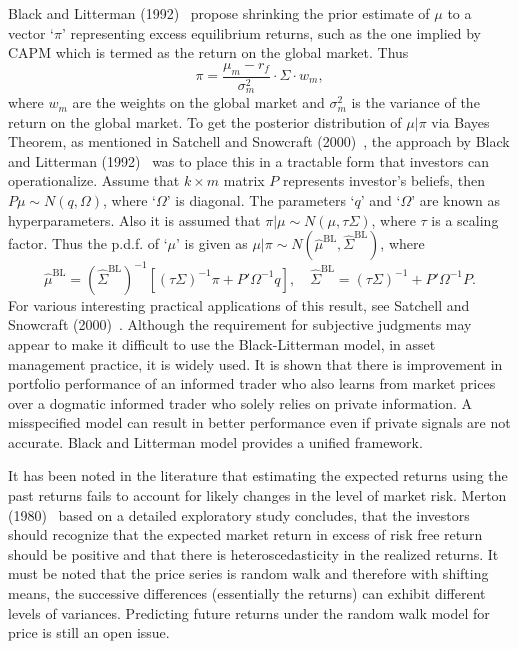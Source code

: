 Black and Litterman (1992)~\cite{blacklit} propose shrinking the prior estimate of $\mu$ to a vector `$\pi$' representing excess equilibrium returns, such as the one implied by CAPM which is termed as the return on the global market. Thus
	\begin{equation} \label{eqn:bigpi}
	\pi = \dfrac{\mu_m-r_f}{\sigma_m^2} \cdot \Sigma \cdot w_m,
	\end{equation}
where $w_m$ are the weights on the global market and $\sigma_m^2$ is the variance of the return on the global market. To get the posterior distribution of $\mu \big| \pi$ via Bayes Theorem, as mentioned in Satchell and Snowcraft (2000)~\cite{snow}, the approach by Black and Litterman (1992)~\cite{blacklit}  was to place this in a tractable form that investors can operationalize. Assume that $k \times m$ matrix $P$ represents investor's beliefs, then $P \mu \sim N(q,\Omega)$, where `$\Omega$' is diagonal. The parameters `$q$' and `$\Omega$' are known as hyperparameters. Also it is assumed that $\pi \big| \mu \sim N(\mu,\tau \Sigma)$, where $\tau$ is a scaling factor. Thus the p.d.f. of `$\mu$' is given as $\mu \big| \pi \sim N(\hat{\mu}^{\text{BL}}, \hat{\Sigma}^{\text{BL}})$, where 
	\begin{equation} \label{eqn:bleq}
	\hat{\mu}^{\text{BL}}= (\hat{\Sigma}^{\text{BL}})^{-1} [ (\tau \Sigma)^{-1}\pi + P' \Omega^{-1}q], \quad \hat{\Sigma}^{\text{BL}}= (\tau \Sigma)^{-1} + P' \Omega^{-1}P.
	\end{equation}
For various interesting practical applications of this result, see Satchell and Snowcraft (2000)~\cite{snow}. Although the requirement for subjective judgments may appear to make it difficult to use the Black-Litterman model, in asset management practice, it is widely used. It is shown that there is improvement in portfolio performance of an informed trader who also learns from market prices over a dogmatic informed trader who solely relies on private information. A misspecified model can result in better performance even if private signals are not accurate. Black and Litterman model provides a unified framework.


It has been noted in the literature that estimating the expected returns using the past returns fails to account for likely changes in the level of market risk. Merton (1980)~\cite{merton} based on a detailed exploratory study concludes, that the investors should recognize that the expected market return in excess of risk free return should be positive and that there is heteroscedasticity in the realized returns. It must be noted that the price series is random walk and therefore with shifting means, the successive differences (essentially the returns) can exhibit different levels of variances. Predicting future returns under the random walk model for price is still an open issue.


